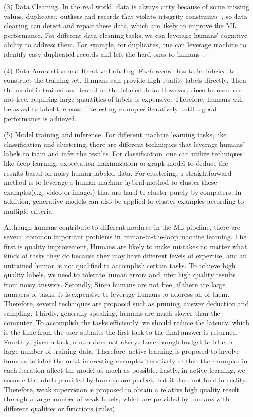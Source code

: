 (3) Data Cleaning. In the real world, data is always dirty because of some missing values, duplicates, outliers and records that violate integrity constraints~\cite{DBLP:crowder,DBLP:conf/sigmod/ChaiC00LM20,DBLP:journals/pvldb/ChuOMIP0Y15}, so data cleaning can detect and repair these data, which are likely to  improve the ML performance. For different data cleaning tasks, we can leverage humans' cognitive ability to address them. For example, for duplicates, one can leverage machine to identify easy duplicated records and left the hard ones to humans~\cite{DBLP:crowder}. 

(4) Data Annotation and Iterative Labeling. Each record has to be labeled to construct the training set. Humans can provide high quality labels directly. Then the model is trained and tested on the labeled data. However, since humans are not free, requiring large quantities of labels is expensive. Therefore, humans will be asked to label the most interesting examples iteratively until a good performance is achieved.

(5) Model training and inference.  For different machine learning tasks, like classification and clustering, there are different techniques that leverage humans' labels to train and infer the results. For classification, one can utilize techniques like deep learning,  expectation maximization or graph model to deduce the results based on noisy human labeled data. For clustering,   a straightforward method is to leverage a human-machine hybrid method to cluster these examples(e.g. video or images) that are hard to cluster purely by computers. In addition, generative models can also be applied to cluster examples according to multiple criteria.

Although  humans contribute to different modules in the ML pipeline, there are several common important problems in human-in-the-loop machine learning. The first is quality improvement, Humans are likely to make mistakes no matter what kinds of tasks they do because they may have different levels of expertise, and an untrained human is not qualified to accomplish certain tasks. To achieve high quality labels, we need to tolerate human errors and infer high quality results from noisy answers. Secondly, Since humans are not free, if there are large numbers of tasks, it is expensive to leverage humans to address all of them. Therefore, several techniques are proposed such as pruning, answer deduction and sampling. Thirdly, generally speaking, humans are much slower than the computer. To accomplish the tasks efficiently, we should reduce the latency, which is the time from the user submits the first task to the final answer is returned.  Fourthly, given a task, a user does not always have enough budget to label a large number of training data. Therefore, 
active learning is proposed to  involve humans to label the most interesting examples iteratively so that the examples in each iteration affect the model as much as possible.  Lastly, in active learning, we assume the labels provided by humans are perfect, but it does not hold in reality. Therefore, weak supervision is proposed to obtain a relative high quality result through a large number of weak labels, which are provided by humans with different qualities or functions (rules).


